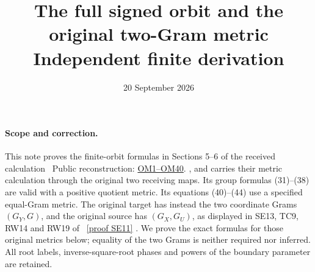 \documentclass[11pt]{article}
\title{The full signed orbit and the original two-Gram metric\\
Independent finite derivation}
\author{}
\date{20 September 2026}
\begin{document}
\maketitle

\paragraph{Scope and correction.}
This note proves the finite-orbit formulas in Sections 5--6 of the
received calculation \cite{Incoming}%
~Public reconstruction: \href{https://github.com/KokunoYumeto/zeta-function-research-reader/blob/689a8f87e9c12b7a99b01b3123438c6751ee608f/workbenches/splitzero-tandem/continuations/20260920-native-secular-frame/ORBIT_METRIC_DERIVATION.tex\#L38}{OM1--OM40}.%
{}, and carries their metric calculation
through the original two receiving maps.  Its group formulas (31)--(38)
are valid with a positive quotient metric.  Its equations (40)--(44)
use a specified equal-Gram metric.  The original target has instead
the two coordinate Grams $(G_Y,G)$, and the original source has
$(G_X,G_U)$, as displayed in SE13, TC9, RW14 and RW19 of \cite{Fable}%
~\href{https://github.com/KokunoYumeto/zeta-function-research-reader/blob/5992ad50c0f2a06921f1fcaded7b4e38097c0739/workbenches/splitzero-tandem/continuations/20260920-original-kernel-mixed-determinants/providers/FABLE_TO_ORIGINAL_CONDUCTOR.tex\#L1967}{[proof SE11]}%
{}.
We prove the exact formulas for those original metrics below; equality
of the two Grams is neither required nor inferred.
All root labels, inverse-square-root phases and powers of the boundary
parameter are retained.
\end{document}
